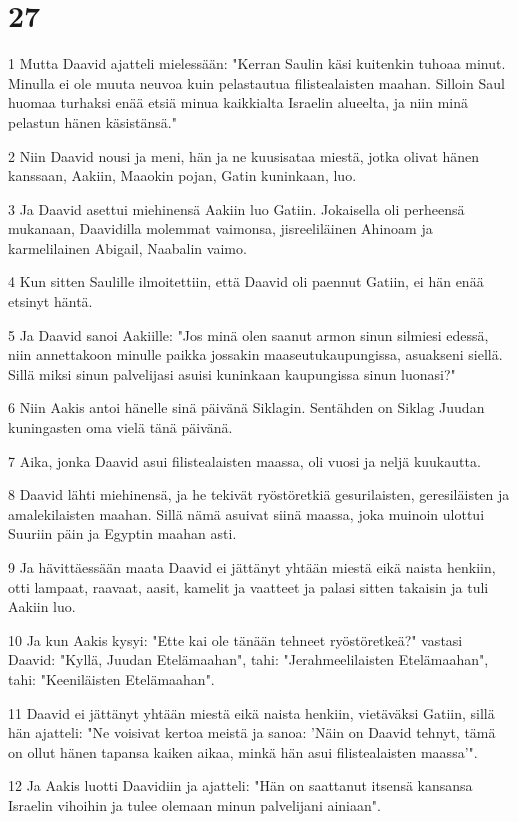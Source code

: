 \chapter{27}

\par 1 Mutta Daavid ajatteli mielessään: "Kerran Saulin käsi kuitenkin tuhoaa minut. Minulla ei ole muuta neuvoa kuin pelastautua filistealaisten maahan. Silloin Saul huomaa turhaksi enää etsiä minua kaikkialta Israelin alueelta, ja niin minä pelastun hänen käsistänsä."
\par 2 Niin Daavid nousi ja meni, hän ja ne kuusisataa miestä, jotka olivat hänen kanssaan, Aakiin, Maaokin pojan, Gatin kuninkaan, luo.
\par 3 Ja Daavid asettui miehinensä Aakiin luo Gatiin. Jokaisella oli perheensä mukanaan, Daavidilla molemmat vaimonsa, jisreeliläinen Ahinoam ja karmelilainen Abigail, Naabalin vaimo.
\par 4 Kun sitten Saulille ilmoitettiin, että Daavid oli paennut Gatiin, ei hän enää etsinyt häntä.
\par 5 Ja Daavid sanoi Aakiille: "Jos minä olen saanut armon sinun silmiesi edessä, niin annettakoon minulle paikka jossakin maaseutukaupungissa, asuakseni siellä. Sillä miksi sinun palvelijasi asuisi kuninkaan kaupungissa sinun luonasi?"
\par 6 Niin Aakis antoi hänelle sinä päivänä Siklagin. Sentähden on Siklag Juudan kuningasten oma vielä tänä päivänä.
\par 7 Aika, jonka Daavid asui filistealaisten maassa, oli vuosi ja neljä kuukautta.
\par 8 Daavid lähti miehinensä, ja he tekivät ryöstöretkiä gesurilaisten, geresiläisten ja amalekilaisten maahan. Sillä nämä asuivat siinä maassa, joka muinoin ulottui Suuriin päin ja Egyptin maahan asti.
\par 9 Ja hävittäessään maata Daavid ei jättänyt yhtään miestä eikä naista henkiin, otti lampaat, raavaat, aasit, kamelit ja vaatteet ja palasi sitten takaisin ja tuli Aakiin luo.
\par 10 Ja kun Aakis kysyi: "Ette kai ole tänään tehneet ryöstöretkeä?" vastasi Daavid: "Kyllä, Juudan Etelämaahan", tahi: "Jerahmeelilaisten Etelämaahan", tahi: "Keeniläisten Etelämaahan".
\par 11 Daavid ei jättänyt yhtään miestä eikä naista henkiin, vietäväksi Gatiin, sillä hän ajatteli: "Ne voisivat kertoa meistä ja sanoa: 'Näin on Daavid tehnyt, tämä on ollut hänen tapansa kaiken aikaa, minkä hän asui filistealaisten maassa'".
\par 12 Ja Aakis luotti Daavidiin ja ajatteli: "Hän on saattanut itsensä kansansa Israelin vihoihin ja tulee olemaan minun palvelijani ainiaan".

